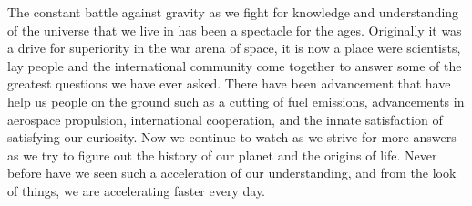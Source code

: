 \documentclass[a4paper,12pt]{article}
\begin{document}
The constant battle against gravity as we fight for knowledge and understanding of the universe that we live in has been a spectacle for the ages. Originally it was a drive for superiority in the war arena of space, it is now a place were scientists, lay people and the international community  come together to answer some of the greatest questions we have ever asked. There have been advancement that have help us people on the ground such as a cutting of fuel emissions, advancements in aerospace propulsion, international cooperation, and the innate satisfaction of satisfying our curiosity. Now we continue to watch as we strive for more answers as we try to figure out the history of our planet and the origins of life. Never before have we seen such a acceleration of our understanding, and from the look of things, we are accelerating faster every day. 

\newpage
\printbibliography
\end{document}
